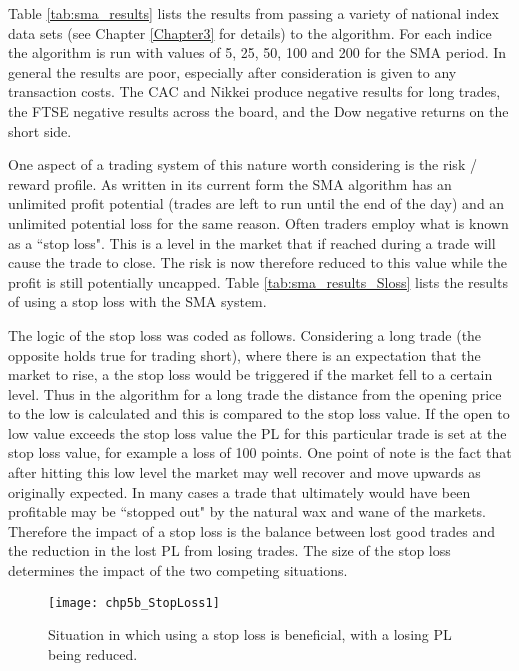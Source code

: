 Table \ref{tab:sma_results} lists the results from passing a variety of national index data sets (see Chapter \ref{Chapter3} for details) to the algorithm. For each indice the algorithm is run with values of 5, 25, 50, 100 and 200 for the SMA period. In general the results are poor, especially after consideration is given to any transaction costs. The CAC and Nikkei produce negative results for long trades, the FTSE negative results across the board, and the Dow negative returns on the short side.




One aspect of a trading system of this nature worth considering is the risk / reward profile. As written in its current form the SMA algorithm has an unlimited profit potential (trades are left to run until the end of the day) and an unlimited potential loss for the same reason. Often traders employ what is known as a \textquotedblleft stop loss". This is a level in the market that if reached during a trade will cause the trade to close. The risk is now therefore reduced to this value while the profit is still potentially uncapped. Table \ref{tab:sma_results_Sloss} lists the results of using a stop loss with the SMA system.

The logic of the stop loss was coded as follows. Considering a long trade (the opposite holds true for trading short), where there is an expectation that the market to rise, a the stop loss would be triggered if the market fell to a certain  level. Thus in the algorithm for a long trade the distance from the opening price to the low is calculated and this is compared to the stop loss value. If the open to low value exceeds the stop loss value the PL for this particular trade is set at the stop loss value, for example a loss of 100 points. One point of note is the fact that after hitting this low level the market may well recover and move upwards as originally expected. In many cases a trade that ultimately would have been profitable may be \textquotedblleft stopped out" by the natural wax and wane of the markets. Therefore the impact of a stop loss is the balance between lost good trades and the reduction in the lost PL from losing trades. The size of the stop loss determines the impact of the two competing situations.

\begin{figure}[tbph]
\centering
\texttt{[image: chp5b\_StopLoss1]}
\caption[Situation in which using a stop loss is beneficial]{Situation in which using a stop loss is beneficial, with a losing PL being reduced.}
\label{fig:chp5:sloss1}
\end{figure}

